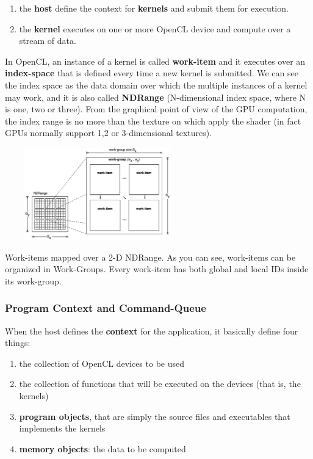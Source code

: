 \begin{enumerate}
	\item the \textbf{host} define the context for \textbf{kernels} and submit them for execution.
	\item the \textbf{kernel} executes on one or more OpenCL device and compute over a stream of data.
\end{enumerate}

In OpenCL, an instance of a kernel is called \textbf{work-item} and it executes over an \textbf{index-space} that is defined every time a new kernel is submitted. We can see the index space as the data domain over which the multiple instances of a kernel may work, and it is also called \textbf{NDRange} (N-dimensional index space, where N is one, two or three). From the graphical point of view of the GPU computation, the index range is no more than the texture on which apply the shader (in fact GPUs normally support 1,2 or 3-dimensional textures).\\

\begin{figurehere}
 \centering
 \includegraphics[width=8cm, height=4cm]{./eps/index-space.eps}
 \caption{Work-items mapped over a 2-D NDRange. As you can see, work-items can be organized in Work-Groups. Every work-item has both global and local IDs inside its work-group.}
 \label{fig:indexSpace}
\end{figurehere}

\subsubsection{Program Context and Command-Queue}

When the host defines the \textbf{context} for the application, it basically define four things:

\begin{enumerate}
	\item the collection of OpenCL devices to be used
	\item the collection of functions that will be executed on the devices (that is, the kernels)
	\item \textbf{program objects}, that are simply the source files and executables that implements the kernels
	\item \textbf{memory objects}: the data to be computed
\end{enumerate}

